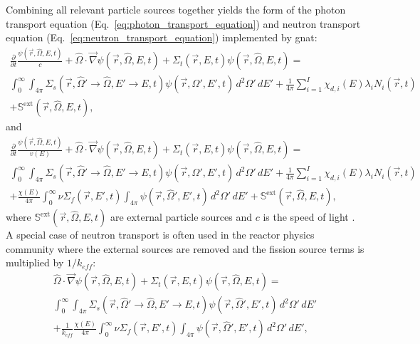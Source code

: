 Combining all relevant particle sources together yields the form of the photon transport equation (Eq.~\ref{eq:photon_transport_equation}) and neutron transport equation (Eq.~\ref{eq:neutron_transport_equation}) implemented by \acrshort{gnat}:
\begin{multline}\label{eq:photon_transport_equation}
    \frac{\partial}{\partial t}\frac{\psi(\vec{r}, \hat{\Omega}, E, t)}{c} + \hat{\Omega}\cdot\vec{\nabla}\psi(\vec{r}, \hat{\Omega}, E, t) + \Sigma_{t}(\vec{r}, E, t)\psi(\vec{r}, \hat{\Omega}, E, t)
    = 
    \\\int_{0}^{\infty}\int_{4\pi} \Sigma_{s}(\vec{r}, \hat{\Omega}' \rightarrow \hat{\Omega}, E' \rightarrow E, t)\psi(\vec{r}, \hat{\Omega}', E', t)\, d^{2}\Omega'\,dE'
    + \frac{1}{4\pi}\sum_{i = 1}^{I} \chi_{d,i}(E)\lambda_{i}N_{i}(\vec{r}, t)
    \\+ \mathbb{S}^{\text{ext}}(\vec{r}, \hat{\Omega}, E, t)
    \text{,}
\end{multline}
and 
\begin{multline}\label{eq:neutron_transport_equation}
    \frac{\partial}{\partial t}\frac{\psi(\vec{r}, \hat{\Omega}, E, t)}{v(E)} + \hat{\Omega}\cdot\vec{\nabla}\psi(\vec{r}, \hat{\Omega}, E, t) + \Sigma_{t}(\vec{r}, E, t)\psi(\vec{r}, \hat{\Omega}, E, t)
    = 
    \\\int_{0}^{\infty}\int_{4\pi} \Sigma_{s}(\vec{r}, \hat{\Omega}' \rightarrow \hat{\Omega}, E' \rightarrow E, t)\psi(\vec{r}, \hat{\Omega}', E', t)\, d^{2}\Omega'\,dE'
    + \frac{1}{4\pi}\sum_{i = 1}^{I} \chi_{d,i}(E)\lambda_{i}N_{i}(\vec{r}, t)
    \\+ \frac{\chi(E)}{4\pi}\int_{0}^{\infty} \nu\Sigma_{f}(\vec{r}, E', t)\int_{4\pi}\psi(\vec{r}, \hat{\Omega}', E', t)\, d^{2}\Omega'\, dE'
    + \mathbb{S}^{\text{ext}}(\vec{r}, \hat{\Omega}, E, t)\text{,}
\end{multline}
where $\mathbb{S}^{\text{ext}}(\vec{r}, \hat{\Omega}, E, t)$ are external particle sources and $c$ is the speed of light \cite{computational_methods,radiation_shielding}. A special case of neutron transport is often used in the reactor physics community where the external sources are removed and the fission source terms is multiplied by $1 / k_{eff}$:
\begin{multline}\label{eq:neutron_transport_equation_eigen}
    \hat{\Omega}\cdot\vec{\nabla}\psi(\vec{r}, \hat{\Omega}, E, t) + \Sigma_{t}(\vec{r}, E, t)\psi(\vec{r}, \hat{\Omega}, E, t)
    = 
    \\\int_{0}^{\infty}\int_{4\pi} \Sigma_{s}(\vec{r}, \hat{\Omega}' \rightarrow \hat{\Omega}, E' \rightarrow E, t)\psi(\vec{r}, \hat{\Omega}', E', t)\, d^{2}\Omega'\,dE'
    \\+ \frac{1}{k_{eff}}\frac{\chi(E)}{4\pi}\int_{0}^{\infty} \nu\Sigma_{f}(\vec{r}, E', t)\int_{4\pi}\psi(\vec{r}, \hat{\Omega}', E', t)\, d^{2}\Omega'\, dE'\text{,}
\end{multline}
